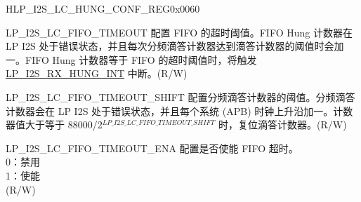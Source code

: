 \begin{register}{H}{LP\_I2S\_LC\_HUNG\_CONF\_REG}{0x0060}\label{regdesc:LPI2SLCHUNGCONFREG}
%
%
%
%
\regnewline%
\begin{regdesc}\begin{reglist}
\label{fielddesc:LPI2SLCFIFOTIMEOUT}\item[LP\_I2S\_LC\_FIFO\_TIMEOUT] 配置 FIFO 的超时阈值。FIFO Hung 计数器在 LP I2S 处于错误状态，并且每次分频滴答计数器达到滴答计数器的阈值时会加一。FIFO Hung 计数器等于 FIFO 的超时阈值时，将触发 \hyperref[int:LPI2SRXHUNGINT]{LP\_I2S\_RX\_HUNG\_INT} 中断。(R/W)
\label{fielddesc:LPI2SLCFIFOTIMEOUTSHIFT}\item[LP\_I2S\_LC\_FIFO\_TIMEOUT\_SHIFT] 配置分频滴答计数器的阈值。分频滴答计数器会在 LP I2S 处于错误状态，并且每个系统 (APB) 时钟上升沿加一。计数器值大于等于 88000/2$^{LP\_I2S\_LC\_FIFO\_TIMEOUT\_SHIFT}$ 时，复位滴答计数器。(R/W)
\label{fielddesc:LPI2SLCFIFOTIMEOUTENA}\item[LP\_I2S\_LC\_FIFO\_TIMEOUT\_ENA] 配置是否使能 FIFO 超时。\\
0：禁用\\
1：使能\\
(R/W)
\end{reglist}\end{regdesc}
\end{register}


